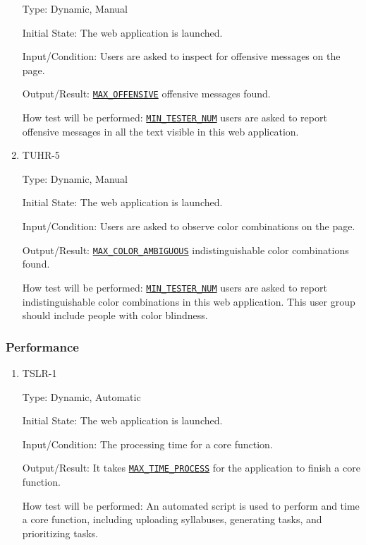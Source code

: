 \documentclass[12pt, titlepage]{article}
\begin{document}
\begin{enumerate}
Type: Dynamic, Manual
					
Initial State: The web application is launched.
					
Input/Condition: Users are asked to inspect for offensive messages on the page.
					
Output/Result: \hyperref[MAX_OFFENSIVE]{\texttt{MAX\_OFFENSIVE}} offensive messages found.
					
How test will be performed: \hyperref[MIN_TESTER_NUM]{\texttt{MIN\_TESTER\_NUM}} users are asked to report offensive messages in all the text visible in this web application.

\item{TUHR-5\\}\label{TUHR-5}

Type: Dynamic, Manual
					
Initial State: The web application is launched.
					
Input/Condition: Users are asked to observe color combinations on the page.
					
Output/Result: \hyperref[MAX_COLOR_AMBIGUOUS]{\texttt{MAX\_COLOR\_AMBIGUOUS}} indistinguishable color combinations found.
					
How test will be performed: \hyperref[MIN_TESTER_NUM]{\texttt{MIN\_TESTER\_NUM}} users are asked to report indistinguishable color combinations in this web application. This user group should include people with color blindness.


\end{enumerate}

\subsubsection{Performance}

\begin{enumerate}
\item{TSLR-1\\}\label{TSLR-1}

Type: Dynamic, Automatic
					
Initial State: The web application is launched.
					
Input/Condition: The processing time for a core function.
					
Output/Result: It takes \hyperref[MAX_TIME_PROCESS]{\texttt{MAX\_TIME\_PROCESS}} for the application to finish a core function.
					
How test will be performed: An automated script is used to perform and time a core function, including uploading syllabuses, generating tasks, and prioritizing tasks.

\end{enumerate}
\end{document}
